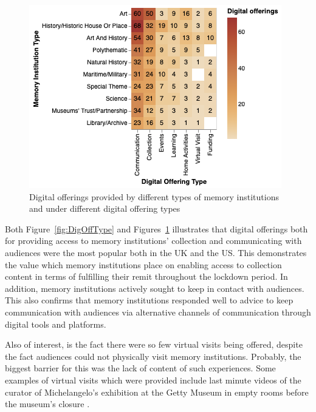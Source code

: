\documentclass{egpubl}
\begin{document}
\begin{figure}[h]
  \centering
  \includegraphics[width=\linewidth]{images/museumoffering.png}
  \caption{\label{fig:MTypeOfferings}
           Digital offerings provided by different types of memory institutions and under different digital offering types}
\end{figure}


Both Figure~\ref{fig:DigOffType} and Figures~\ref{fig:MTypeOfferings} illustrates that digital offerings both for providing access to memory institutions' collection and communicating with audiences were the most popular both in the UK and the US. This demonstrates the value which memory institutions place on enabling access to collection content in terms of fulfilling their remit throughout the lockdown period. In addition, memory institutions actively sought to keep in contact with audiences. This also confirms that memory institutions responded well to advice to keep communication with audiences via alternative channels of communication through digital tools and platforms. 



Also of interest, is the fact there  were so few virtual visits being offered, despite the fact audiences could not physically visit memory institutions. Probably, the biggest barrier for this was the lack of content of such experiences. Some examples of virtual visits which were provided include last minute videos of the curator of Michelangelo's exhibition at the Getty Museum in empty rooms before the museum's closure \cite{getty2020}.

\end{document}
